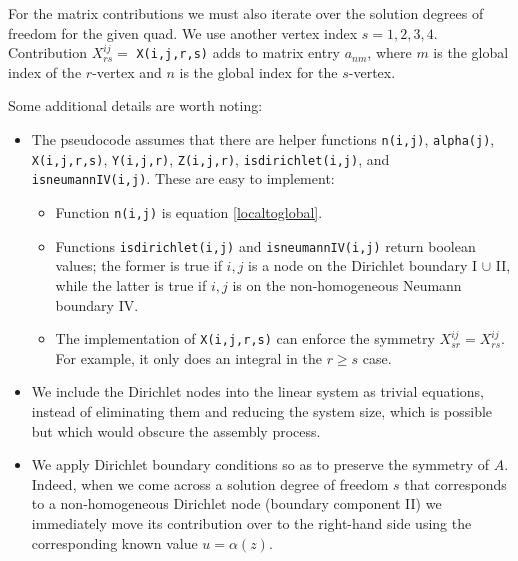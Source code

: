 \documentclass[11pt,final,reqno]{amsart}
\theoremstyle{remark}
\theoremstyle{definition}
\begin{document}
For the matrix contributions we must also iterate over the solution degrees of freedom for the given quad.  We use another vertex index $s=1,2,3,4$.  Contribution $X^{ij}_{rs}=$ \texttt{X(i,j,r,s)} adds to matrix entry $a_{nm}$, where $m$ is the global index of the $r$-vertex and $n$ is the global index for the $s$-vertex.

Some additional details are worth noting:
\begin{itemize}
  \item The pseudocode assumes that there are helper functions \texttt{n(i,j)}, \texttt{alpha(j)}, \texttt{X(i,j,r,s)}, \texttt{Y(i,j,r)}, \texttt{Z(i,j,r)}, \texttt{isdirichlet(i,j)}, and \texttt{isneumannIV(i,j)}.  These are easy to implement:
    \begin{itemize}
      \item Function \texttt{n(i,j)} is equation \eqref{localtoglobal}.
      \item Functions \texttt{isdirichlet(i,j)} and \texttt{isneumannIV(i,j)} return boolean values; the former is true if $i,j$ is a node on the Dirichlet boundary I $\cup$ II, while the latter is true if $i,j$ is on the non-homogeneous Neumann boundary IV.
      \item The implementation of \texttt{X(i,j,r,s)} can enforce the symmetry $X^{ij}_{sr}=X^{ij}_{rs}$.  For example, it only does an integral in the $r\ge s$ case.
    \end{itemize}
  \item We include the Dirichlet nodes into the linear system as trivial equations, instead of eliminating them and reducing the system size, which is possible but which would obscure the assembly process.
  \item We apply Dirichlet boundary conditions so as to preserve the symmetry of $A$.  Indeed, when we come across a solution degree of freedom $s$ that corresponds to a non-homogeneous Dirichlet node (boundary component II) we immediately move its contribution over to the right-hand side using the corresponding known value $u=\alpha(z)$.
\end{itemize}
\end{document}
